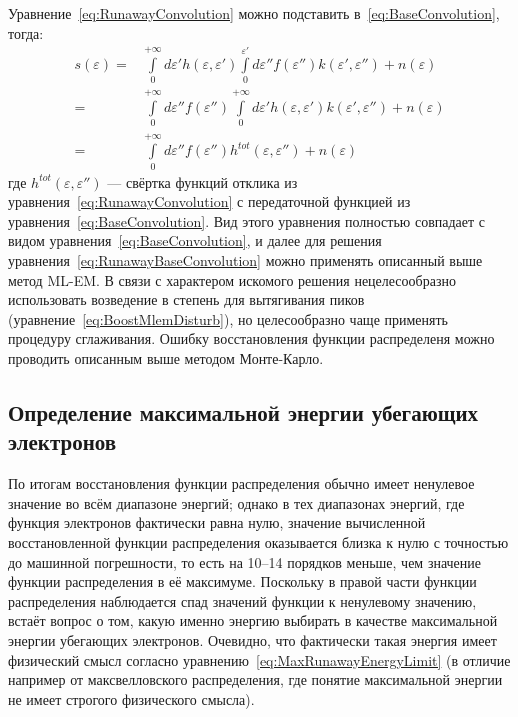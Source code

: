 Уравнение~\ref{eq:RunawayConvolution} можно подставить в~\ref{eq:BaseConvolution}, тогда:
\begin{equation}
  \label{eq:RunawayBaseConvolution}
  \begin{alignedat}{1}
    s( \varepsilon ) = & \int \limits_0^{+\infty} d \varepsilon' h( \varepsilon, \varepsilon' ) \int \limits_0^{\varepsilon'} d \varepsilon'' f( \varepsilon'') k( \varepsilon', \varepsilon'' ) + n(\varepsilon) \\
    = & \int \limits_0^{+\infty} d \varepsilon'' f( \varepsilon'' ) \int \limits_0^{+\infty} d \varepsilon' h( \varepsilon, \varepsilon' ) k( \varepsilon', \varepsilon'' ) + n(\varepsilon) \\ 
    = & \int \limits_0^{+\infty} d \varepsilon'' f( \varepsilon'' ) h^{tot}( \varepsilon, \varepsilon'' ) + n(\varepsilon)
  \end{alignedat}  
\end{equation}
где $h^{tot}( \varepsilon, \varepsilon'' )$ --- свёртка функций отклика из уравнения~\ref{eq:RunawayConvolution} с передаточной функцией из уравнения~\ref{eq:BaseConvolution}. Вид этого уравнения полностью совпадает с видом уравнения~\ref{eq:BaseConvolution}, и далее для решения уравнения~\ref{eq:RunawayBaseConvolution} можно применять описанный выше метод ML-EM. В связи с характером искомого решения нецелесообразно использовать возведение в степень для вытягивания пиков (уравнение~\ref{eq:BoostMlemDisturb}), но целесообразно чаще применять процедуру сглаживания. Ошибку восстановления функции распределеня можно проводить описанным выше методом Монте-Карло.~\cite{Shevelev2013}


\subsection{Определение максимальной энергии убегающих электронов}

По итогам восстановления функции распределения обычно имеет ненулевое значение во всём диапазоне энергий; однако в тех диапазонах энергий, где функция электронов фактически равна нулю, значение вычисленной восстановленной функции распределения оказывается близка к нулю с точностью до машинной погрешности, то есть на 10--14 порядков меньше, чем значение функции распределения в её максимуме. Поскольку в правой части функции распределения наблюдается спад значений функции к ненулевому значению, встаёт вопрос о том, какую именно энергию выбирать в качестве максимальной энергии убегающих электронов. Очевидно, что фактически такая энергия имеет физический смысл согласно уравнению~\ref{eq:MaxRunawayEnergyLimit} (в отличие например от максвелловского распределения, где понятие максимальной энергии не имеет строгого физического смысла). 

